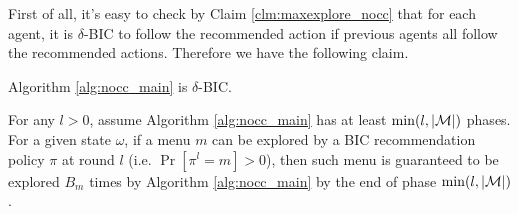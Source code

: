 First of all, it's easy to check by Claim \ref{clm:maxexplore_nocc} that for each agent, it is $\delta$-BIC to follow the recommended action if previous agents all follow the recommended actions. Therefore we have the following claim.
\begin{claim}
\label{clm:nocc_BIC}
Algorithm \ref{alg:nocc_main} is $\delta$-BIC.
\end{claim}


\begin{lemma}
\label{lem:exp_nocc}
For any $l > 0$, assume Algorithm \ref{alg:nocc_main} has at least $\min(l, |\mathcal{M}|)$ phases.
For a given state $\omega$, if a menu $m$ can be explored by a BIC recommendation policy $\pi$ at round $l$ (i.e. $ \Pr[\pi^l= m]> 0$), then such menu is guaranteed to be explored $B_m$ times by Algorithm \ref{alg:nocc_main} by the end of phase $\min(l, |\mathcal{M}|)$.
\end{lemma}

